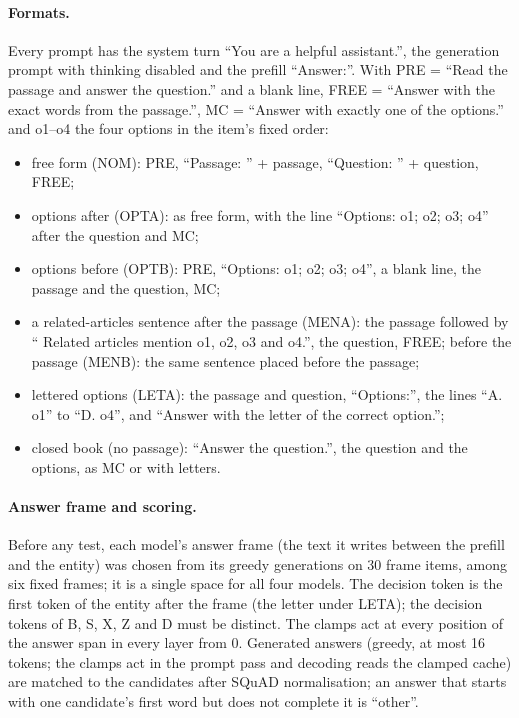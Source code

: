 \paragraph{Formats.} Every prompt has the system turn ``You are a helpful assistant.'', the generation prompt with thinking disabled and the prefill ``Answer:''. With PRE = ``Read the passage and answer the question.'' and a blank line, FREE = ``Answer with the exact words from the passage.'', MC = ``Answer with exactly one of the options.'' and o1--o4 the four options in the item's fixed order:
\begin{itemize}\setlength\itemsep{0pt}
  \item free form (NOM): PRE, ``Passage: '' + passage, ``Question: '' + question, FREE;
  \item options after (OPTA): as free form, with the line ``Options: o1; o2; o3; o4'' after the question and MC;
  \item options before (OPTB): PRE, ``Options: o1; o2; o3; o4'', a blank line, the passage and the question, MC;
  \item a related-articles sentence after the passage (MENA): the passage followed by `` Related articles mention o1, o2, o3 and o4.'', the question, FREE; before the passage (MENB): the same sentence placed before the passage;
  \item lettered options (LETA): the passage and question, ``Options:'', the lines ``A. o1'' to ``D. o4'', and ``Answer with the letter of the correct option.'';
  \item closed book (no passage): ``Answer the question.'', the question and the options, as MC or with letters.
\end{itemize}
\paragraph{Answer frame and scoring.} Before any test, each model's answer frame (the text it writes between the prefill and the entity) was chosen from its greedy generations on 30 frame items, among six fixed frames; it is a single space for all four models. The decision token is the first token of the entity after the frame (the letter under LETA); the decision tokens of B, S, X, Z and D must be distinct. The clamps act at every position of the answer span in every layer from 0. Generated answers (greedy, at most 16 tokens; the clamps act in the prompt pass and decoding reads the clamped cache) are matched to the candidates after SQuAD normalisation; an answer that starts with one candidate's first word but does not complete it is ``other''.

